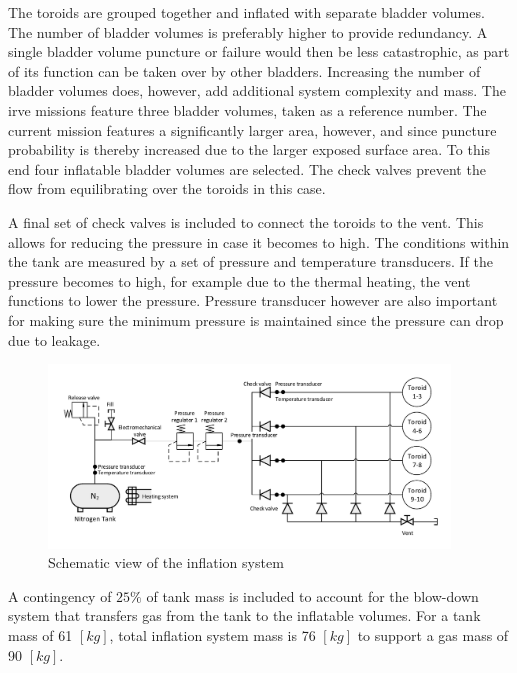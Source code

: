 The toroids are grouped together and inflated with separate bladder volumes.  The number of bladder volumes is preferably higher to provide redundancy. A single bladder volume puncture or failure would then be less catastrophic, as part of its function can be taken over by other bladders. Increasing the number of bladder volumes does, however, add additional system complexity and mass. The \gls{irve} missions feature three bladder volumes, taken as a reference number. The current mission features a significantly larger area, however, and since puncture probability is thereby increased due to the larger exposed surface area. To this end four inflatable bladder volumes are selected. The check valves prevent the flow from equilibrating over the toroids in this case.

A final set of check valves is included to connect the toroids to the vent. This allows for reducing the pressure in case it becomes to high. The conditions within the tank are measured by a set of pressure and temperature transducers. If the pressure becomes to high, for example due to the thermal heating, the vent functions to lower the pressure. Pressure transducer however are also important for making sure the minimum pressure is maintained since the pressure can drop due to leakage. 

\begin{figure}[h]
		\centering
		\includegraphics[width=0.95\textwidth]{./Figure/Structure/infsys.pdf}
		\caption[Schematic view of the inflation system]{Schematic view of the inflation system}%
		\label{fig:infsys}
\end{figure}


A contingency of $25\%$ of tank mass is included to account for the blow-down system that transfers gas from the tank to the inflatable volumes. For a tank mass of 61 $[kg]$, total inflation system mass is 76 $[kg]$ to support a gas mass of 90 $[kg]$.
